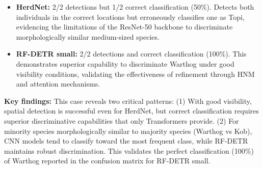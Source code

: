 \begin{itemize}
    \item \textbf{HerdNet:} 2/2 detections but 1/2 correct classification (50\%). Detects both individuals in the correct locations but erroneously classifies one as Topi, evidencing the limitations of the ResNet-50 backbone to discriminate morphologically similar medium-sized species.
    \item \textbf{RF-DETR small:} 2/2 detections and correct classification (100\%). This demonstrates superior capability to discriminate Warthog under good visibility conditions, validating the effectiveness of refinement through HNM and attention mechanisms.
\end{itemize}

\textbf{Key findings:} This case reveals two critical patterns: (1) With good visibility, spatial detection is successful even for HerdNet, but correct classification requires superior discriminative capabilities that only Transformers provide. (2) For minority species morphologically similar to majority species (Warthog vs Kob), CNN models tend to classify toward the most frequent class, while RF-DETR maintains robust discrimination. This validates the perfect classification (100\%) of Warthog reported in the confusion matrix for RF-DETR small.
